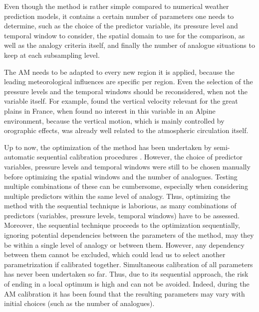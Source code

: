 \documentclass[twocol]{ametsoc}
\begin{document}
Even though the method is rather simple compared to numerical weather prediction models, it contains a certain number of parameters one needs to determine, such as the choice of the predictor variable, its pressure level and temporal window to consider, the spatial domain to use for the comparison, as well as the analogy criteria itself, and finally the number of analogue situations to keep at each subsampling level. 

The AM needs to be adapted to every new region it is applied, because the leading meteorological influences are specific per region. Even the selection of the pressure levels and the temporal windows should be reconsidered, when not the variable itself. For example, \citet{BenDaoud2010} found the vertical velocity relevant for the great plains in France, when \citet{Horton2012a} found no interest in this variable in an Alpine environment, because the vertical motion, which is mainly controlled by orographic effects, was already well related to the atmospheric circulation itself.

Up to now, the optimization of the method has been undertaken by semi-automatic sequential calibration procedures \citep[see][for its definition]{Bontron2004, Horton2016}. However, the choice of predictor variables, pressure levels and temporal windows were still to be chosen manually before optimizing the spatial windows and the number of analogues. Testing multiple combinations of these can be cumbersome, especially when considering multiple predictors within the same level of analogy. Thus, optimizing the method with the sequential technique is laborious, as many combinations of predictors (variables, pressure levels, temporal windows) have to be assessed. Moreover, the sequential technique proceeds to the optimization sequentially, ignoring potential dependencies between the parameters of the method, may they be within a single level of analogy or between them. However, any dependency between them cannot be excluded, which could lead us to select another parametrization if calibrated together. Simultaneous calibration of all parameters has never been undertaken so far. Thus, due to its sequential approach, the risk of ending in a local optimum is high and can not be avoided. Indeed, during the AM calibration it has been found that the resulting parameters may vary with initial choices (such as the number of analogues).
\end{document}
